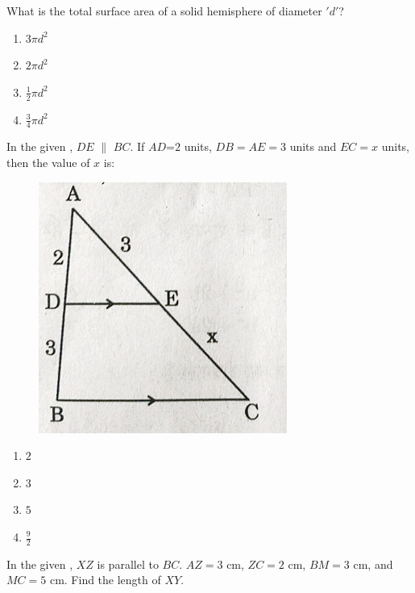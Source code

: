 %
    \item What is the total surface area of a solid hemisphere of diameter $'d'$?
    \begin{enumerate}
       \item $3$$\pi d^2$  \item $2$$\pi d^2$  \item $\frac{1}{2}\pi d^2$
        \item $\frac{3}{4}\pi d^2$
    \end{enumerate}   
\item  In the given , $DE$ $\parallel$ $BC$. If $AD$=$2$ units, $DB=AE=3$ units and $EC=x$ units, then the value of $x$ is:
\begin{figure}[H]
    \centering
    \includegraphics[width=\columnwidth]{figs/fig6.png}
    \caption{}
    \label{fig:fig6.png}
\end{figure}
\begin{enumerate}
    \item $2$ \item $3$ \item $5$ \item $\frac{9}{2}$
\end{enumerate}
\item In the given , $XZ$ is parallel to $BC$. $AZ = 3$ cm, $ZC = 2$ cm, $BM = 3$ cm, and $MC = 5$ cm. Find the length of $XY$.


